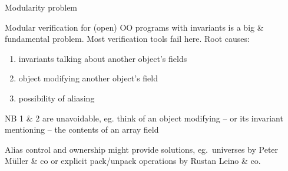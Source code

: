 \documentclass[
pdf,
nocolorBG,
slideColor,
cok,
]{prosper}
\begin{document}
\begin{slide}{Modularity problem}
\vspace*{-6ex}

{\blue Modular verification for (open) OO programs
with invariants} is a big \& fundamental problem.
Most verification tools fail here.
Root causes:
\begin{enumerate}
\item invariants talking about another object's fields
\item object modifying another object's field
\item possibility of {\green aliasing}
\end{enumerate}

{\scriptsize NB 1 \& 2 are unavoidable, eg. think of an object
modifying  -- or its invariant mentioning -- the contents of an 
array field}

\medskip

Alias control and ownership might provide solutions,
eg.\ universes by Peter M\"uller \& co or 
explicit pack/unpack operations by Rustan Leino \& co.

\end{slide}
\end{document}
